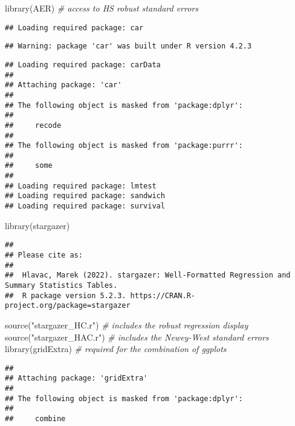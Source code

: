 \documentclass[
]{article}
\newenvironment{Shaded}{\begin{snugshade}}{\end{snugshade}}
\newcommand{\CommentTok}[1]{\textcolor[rgb]{0.56,0.35,0.01}{\textit{#1}}}
\newcommand{\FunctionTok}[1]{\textcolor[rgb]{0.00,0.00,0.00}{#1}}
\newcommand{\NormalTok}[1]{#1}
\newcommand{\StringTok}[1]{\textcolor[rgb]{0.31,0.60,0.02}{#1}}
\begin{document}
\begin{Shaded}
\begin{Highlighting}[]
\FunctionTok{library}\NormalTok{(AER)          }\CommentTok{\# access to HS robust standard errors}
\end{Highlighting}
\end{Shaded}

\begin{verbatim}
## Loading required package: car
\end{verbatim}

\begin{verbatim}
## Warning: package 'car' was built under R version 4.2.3
\end{verbatim}

\begin{verbatim}
## Loading required package: carData
## 
## Attaching package: 'car'
## 
## The following object is masked from 'package:dplyr':
## 
##     recode
## 
## The following object is masked from 'package:purrr':
## 
##     some
## 
## Loading required package: lmtest
## Loading required package: sandwich
## Loading required package: survival
\end{verbatim}

\begin{Shaded}
\begin{Highlighting}[]
\FunctionTok{library}\NormalTok{(stargazer)}
\end{Highlighting}
\end{Shaded}

\begin{verbatim}
## 
## Please cite as: 
## 
##  Hlavac, Marek (2022). stargazer: Well-Formatted Regression and Summary Statistics Tables.
##  R package version 5.2.3. https://CRAN.R-project.org/package=stargazer
\end{verbatim}

\begin{Shaded}
\begin{Highlighting}[]
\FunctionTok{source}\NormalTok{(}\StringTok{"stargazer\_HC.r"}\NormalTok{)  }\CommentTok{\# includes the robust regression display}
\FunctionTok{source}\NormalTok{(}\StringTok{"stargazer\_HAC.r"}\NormalTok{)  }\CommentTok{\# includes the Newey{-}West standard errors}
\FunctionTok{library}\NormalTok{(gridExtra)  }\CommentTok{\# required for the combination of ggplots}
\end{Highlighting}
\end{Shaded}

\begin{verbatim}
## 
## Attaching package: 'gridExtra'
## 
## The following object is masked from 'package:dplyr':
## 
##     combine
\end{verbatim}
\end{document}
